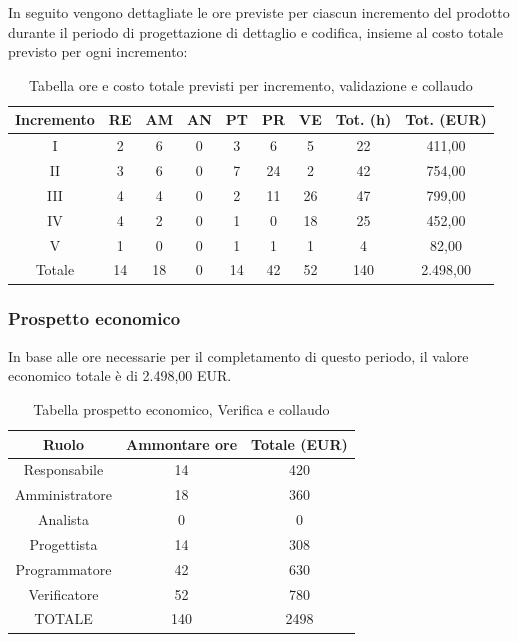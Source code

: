 \FloatBarrier
\noindent In seguito vengono dettagliate le ore previste per ciascun incremento del prodotto durante il periodo di progettazione di dettaglio e codifica, insieme al costo totale previsto per ogni incremento:
\begin{table}[h!]
	\caption{Tabella ore e costo totale previsti per incremento, validazione e collaudo}
	\begin{center}
		\begin{tabular}{ |c|c|c|c|c|c|c|c|c|  }
			\hline
			Incremento 		& RE 	& AM 	& AN 	& PT 	& PR 	& VE 	& Tot. (h) & Tot. (EUR) \\
			\hline\hline
			I		& 2 		& 6			& 0 	& 3 	& 6 		& 5 		& 22	 & 411,00\\
			II		& 3 		& 6 		& 0 	& 7	& 24 		& 2 		&42	& 754,00\\
			III		& 4 		& 4 		& 0 	& 2	& 11 		& 26 		& 47	&799,00\\
			IV		& 4 		& 2 		& 0 	& 1 	& 0 		& 18 		& 25 	&452,00\\
			V		& 1 		& 0 		& 0 	& 1		& 1 		& 1	 		& 4			&82,00\\
			\hline\hline
			Totale		& 14		& 18		& 0 	& 14	 	& 42 	& 52 	& 140 	&2.498,00\\
			\hline
		\end{tabular}
	\end{center}
\end{table}
\subsubsection{Prospetto economico}
In base alle ore necessarie per il completamento di questo periodo, il valore economico totale è di 2.498,00 EUR.
\begin{table}[h!]
\caption{Tabella prospetto economico, Verifica e collaudo}
\begin{center}
\begin{tabular}{ |c|c|c|  }
 \hline
 Ruolo 		& Ammontare ore 	& Totale (EUR)\\
 \hline
 \hline
 	Responsabile	& 14 	& 420\\
	Amministratore	& 18		& 360\\
	Analista		& 0 		& 0\\
	Progettista		& 14		& 308\\
	Programmatore	& 42		& 630\\
	Verificatore	& 52 	& 780\\
 \hline\hline
 TOTALE		& 140		& 2498\\
  \hline
\end{tabular}
\end{center}
\end{table}
\newpage
